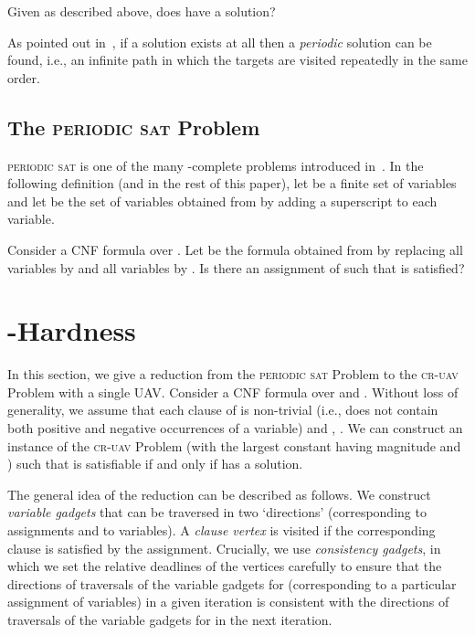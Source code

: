 \documentclass[envcountsame]{llncs}
\begin{document}
\begin{definition}
Given  as described above, does  have a solution?
\end{definition}

As pointed out in~\cite{Fargeas2013}, if a
solution exists at all then a \emph{periodic} solution can be found, i.e., an
infinite path in which the targets are visited repeatedly in the same
order.




\subsection{The \textsc{periodic sat} Problem}

\textsc{periodic sat} is one of the many -complete
problems introduced in~\cite{Orlin1981}.  In the following definition
(and in the rest of this paper), let  be a finite set of
variables and let  be the set of variables obtained
from  by adding a superscript  to each variable.


\begin{definition}
Consider a CNF formula  over . Let  be the formula obtained from
 by replacing all variables  by
 and all variables  by .
Is there an assignment of  such
that  is satisfied?
\end{definition}








\section{-Hardness}

In this section, we give a reduction from the \textsc{periodic sat}
Problem to the \textsc{cr-uav} Problem with a single UAV\@.
Consider a CNF formula 
over  and .  Without loss of generality, we assume that
each clause  of  is non-trivial (i.e.,  does not
contain both positive and negative occurrences of a variable) and , . We can construct an instance  of the \textsc{cr-uav}
Problem (with the largest constant having magnitude  and ) such that  is satisfiable
if and only if  has a solution.

The general idea of the reduction can be described as follows. We
construct \emph{variable gadgets} that can be traversed in two
`directions' (corresponding to assignments  and
 to variables). A \emph{clause vertex} is visited if
the corresponding clause is satisfied by the assignment.  Crucially,
we use \emph{consistency gadgets}, in which we set the relative
deadlines of the vertices carefully to ensure that the directions of
traversals of the variable gadgets for  (corresponding
to a particular assignment of variables) in a given iteration is
consistent with the directions of traversals of the variable gadgets
for  in the next iteration.
\end{document}
